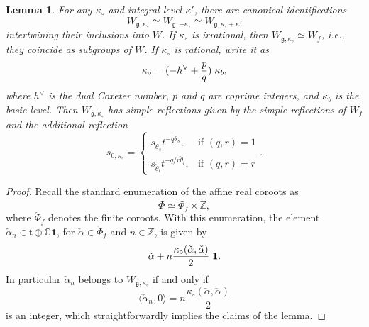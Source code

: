 \documentclass[11pt,reqno]{amsart}
\newcommand{\halpha}{\check{\alpha}}
\newcommand{\ft}{\mathfrak{t}}
\newcommand{\fg}{\mathfrak{g}}
\newtheorem{lemma}[subsubsection]{Lemma}
\theoremstyle{remark}
\numberwithin{equation}{section}
\begin{document}
\begin{lemma} \label{l:simprefs}For any $\kappa_{\circ}$ and integral level 
$\kappa'$, there are 
canonical identifications
	\begin{equation} \label{e:coxeq1}
	W_{\fg, \kappa_{\circ}} \simeq W_{\fg, -\kappa_{\circ}} \simeq W_{\fg, 
	\kappa_{\circ} + \kappa'}
	\end{equation}
	intertwining their inclusions into $W$. If $\kappa_{\circ}$ is irrational, 
	then $W_{\fg, \kappa_{\circ}} 
\simeq W_f$, i.e., they coincide as subgroups of $W$. If $\kappa_{\circ}$ is 
rational, write it as  
%
\[ \kappa_{\circ} = (-h^\vee + \frac{p}{q})\hspace{1mm} \kappa_b,
\]	
%	
where $h^\vee$ is the dual Coxeter number, $p$ and $q$ are coprime integers, 
and $\kappa_b$ is the basic level. Then $W_{\fg, \kappa_{\circ}}$ has simple 
reflections given by the simple reflections 
of $W_f$ and the additional reflection
\begin{equation} \label{e:cases} s_{0, \kappa_\circ} = \begin{cases} 
s_{\check{\theta}_s} t^{-q 
	\check{\theta}_s }, & \text{if } (q, r) = 1 \\[2mm] 
s_{\check{\theta}_l} 
t^{-q/r 
	\check{\theta}_l }, & \text{if } (q, r) = r \end{cases}.
\end{equation}
\end{lemma}


\begin{proof} Recall the standard enumeration of the affine real coroots as 
	\[\check{\Phi} 
	\simeq \check{\Phi}_f 
	\times \mathbb{Z},\] where $\check{\Phi}_f$ denotes the finite  
	coroots. With 
	this 
	enumeration, the 
	element $\halpha_n \in \ft \oplus \mathbb{C} \mathbf{1}$, for $\halpha \in 
	\check{\Phi}_f$ 
	and $n 
	\in \mathbb{Z}$, is given by 
	\[ \halpha + n \frac{\kappa_{\circ}(\halpha, \halpha)}{2} \hspace{1mm} 
	\mathbf{1}.
	\]
	In particular $\halpha_n$ belongs to $W_{\fg, \kappa_\circ}$ if and only if 
	\[ \langle \halpha_n, 0 \rangle = n\frac{\kappa_\circ( \halpha, 
		\halpha)}{2}\]
	is an integer, which straightforwardly implies the claims of the lemma. 
\end{proof}
\end{document}
